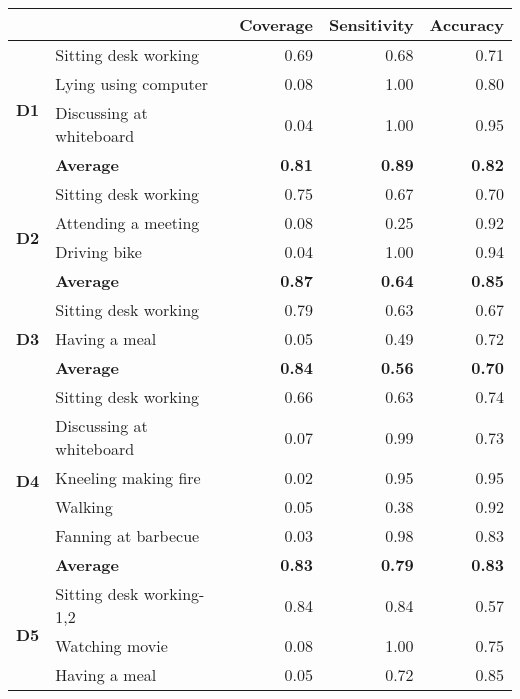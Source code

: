 \documentclass{sigchi}
\begin{document}
\begin{table}[htbp]
  \centering
    \setlength{\tabcolsep}{2pt}
    \def\arraystretch{1.2}
    \begin{tabular}{llrrr}
      \toprule
          &       & \textbf{Coverage} & \textbf{Sensitivity} & \textbf{Accuracy} \\
    \midrule
    \multirow{4}[0]{*}{\textbf{D1}} & Sitting desk working & 0.69  & 0.68  & 0.71  \\
          & Lying using computer & 0.08  & 1.00  & 0.80  \\
          & Discussing at whiteboard & 0.04  & 1.00  & 0.95  \\
          & \textbf{Average} & \textbf{0.81 } & \textbf{0.89 } & \textbf{0.82 } \\
          \hline
    \multirow{4}[0]{*}{\textbf{D2}} & Sitting desk working & 0.75  & 0.67  & 0.70  \\
          & Attending a meeting & 0.08  & 0.25  & 0.92  \\
          & Driving bike & 0.04  & 1.00  & 0.94  \\
          & \textbf{Average} & \textbf{0.87 } & \textbf{0.64 } & \textbf{0.85 } \\
          \hline
    \multirow{3}[0]{*}{\textbf{D3}} & Sitting desk working & 0.79  & 0.63  & 0.67  \\
          & Having a meal & 0.05  & 0.49  & 0.72  \\
          & \textbf{Average} & \textbf{0.84 } & \textbf{0.56 } & \textbf{0.70 } \\
          \hline
    \multirow{6}[0]{*}{\textbf{D4}} & Sitting desk working & 0.66  & 0.63  & 0.74  \\
          & Discussing at whiteboard & 0.07  & 0.99  & 0.73  \\
          & Kneeling making fire & 0.02  & 0.95  & 0.95  \\
          & Walking & 0.05  & 0.38  & 0.92  \\
          & Fanning at barbecue & 0.03  & 0.98  & 0.83  \\
          & \textbf{Average} & \textbf{0.83 } & \textbf{0.79 } & \textbf{0.83 } \\
          \hline
    \multirow{4}[0]{*}{\textbf{D5}} & Sitting desk working-1,2 & 0.84  & 0.84  & 0.57  \\
          & Watching movie & 0.08  & 1.00  & 0.75  \\
          & Having a meal & 0.05  & 0.72  & 0.85  \\

\end{tabular}
\end{table}
\end{document}
